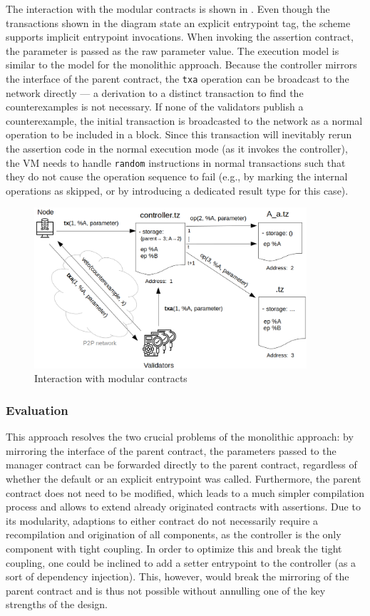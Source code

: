 The interaction with the modular contracts is shown in . Even though the transactions shown in the diagram state an explicit entrypoint tag, the scheme supports implicit entrypoint invocations. When invoking the assertion contract, the parameter is passed as the raw parameter value. The execution model is similar to the model for the monolithic approach. Because the controller mirrors the interface of the parent contract, the \texttt{txa} operation can be broadcast to the network directly --- a derivation to a distinct transaction to find the counterexamples is not necessary. If none of the validators publish a counterexample, the initial transaction is broadcasted to the network as a normal operation to be included in a block. Since this transaction will inevitably rerun the assertion code in the normal execution mode (as it invokes the controller), the VM needs to handle \texttt{random} instructions in normal transactions such that they do not cause the operation sequence to fail (e.g., by marking the internal operations as skipped, or by introducing a dedicated result type for this case). 
\begin{figure}[h]
\centering
  \includegraphics[width=0.9\textwidth]{figures/5-offline_tezos/interaction_modular.png}
	\caption{Interaction with modular contracts}
	\label{fig:interaction_modular}
\end{figure}

\subsubsection{Evaluation}
This approach resolves the two crucial problems of the monolithic approach: by mirroring the interface of the parent contract, the parameters passed to the manager contract can be forwarded directly to the parent contract, regardless of whether the default or an explicit entrypoint was called. Furthermore, the parent contract does not need to be modified, which leads to a much simpler compilation process and allows to extend already originated contracts with assertions. Due to its modularity, adaptions to either contract do not necessarily require a recompilation and origination of all components, as the controller is the only component with tight coupling. In order to optimize this and break the tight coupling, one could be inclined to add a setter entrypoint to the controller (as a sort of dependency injection). This, however, would break the mirroring of the parent contract and is thus not possible without annulling one of the key strengths of the design.

